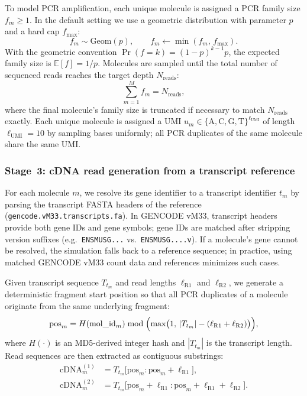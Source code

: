 To model PCR amplification, each unique molecule is assigned a PCR family size $f_m\ge 1$.
In the default setting we use a geometric distribution with parameter $p$ and a hard cap $f_{\max}$:
\begin{equation}
f_m \sim \mathrm{Geom}(p),
\qquad
f_m \leftarrow \min(f_m,\, f_{\max}).
\end{equation}
With the geometric convention $\Pr(f=k)=(1-p)^{k-1}p$, the expected family size is $\mathbb{E}[f]=1/p$.
Molecules are sampled until the total number of sequenced reads reaches the target depth $N_{\mathrm{reads}}$:
\begin{equation}
\sum_{m=1}^{M} f_m = N_{\mathrm{reads}},
\end{equation}
where the final molecule's family size is truncated if necessary to match $N_{\mathrm{reads}}$ exactly. Each unique molecule is assigned a UMI $u_m \in \{\mathrm{A,C,G,T}\}^{\ell_{\mathrm{UMI}}}$ of length $\ell_{\mathrm{UMI}}=10$ by sampling bases uniformly; all PCR duplicates of the same molecule share the same UMI.

\subsubsection*{Stage~3: cDNA read generation from a transcript reference}

For each molecule $m$, we resolve its gene identifier to a transcript identifier $t_m$ by parsing the transcript FASTA headers of the reference
(\texttt{gencode.vM33.transcripts.fa}). In GENCODE vM33, transcript headers provide both gene IDs and gene symbols; gene IDs are matched after stripping version suffixes (e.g.\ \texttt{ENSMUSG...} vs.\ \texttt{ENSMUSG....v}).
If a molecule's gene cannot be resolved, the simulation falls back to a reference sequence; in practice, using matched GENCODE vM33 count data and references minimizes such cases.

Given transcript sequence $T_{t_m}$ and read lengths $\ell_{\mathrm{R1}}$ and $\ell_{\mathrm{R2}}$, we generate a deterministic fragment start position so that all PCR duplicates of a molecule originate from the same underlying fragment:
\begin{equation}
\mathrm{pos}_m =
H(\mathrm{mol\_id}_m)
\bmod \Bigl(\max\bigl(1,\, |T_{t_m}| - (\ell_{\mathrm{R1}}+\ell_{\mathrm{R2}})\bigr)\Bigr),
\end{equation}
where $H(\cdot)$ is an MD5-derived integer hash and $|T_{t_m}|$ is the transcript length.
Read sequences are then extracted as contiguous substrings:
\begin{align}
\mathrm{cDNA}^{(1)}_m &= T_{t_m}\bigl[\mathrm{pos}_m : \mathrm{pos}_m+\ell_{\mathrm{R1}}\bigr],\\
\mathrm{cDNA}^{(2)}_m &= T_{t_m}\bigl[\mathrm{pos}_m+\ell_{\mathrm{R1}} : \mathrm{pos}_m+\ell_{\mathrm{R1}}+\ell_{\mathrm{R2}}\bigr].
\end{align}

